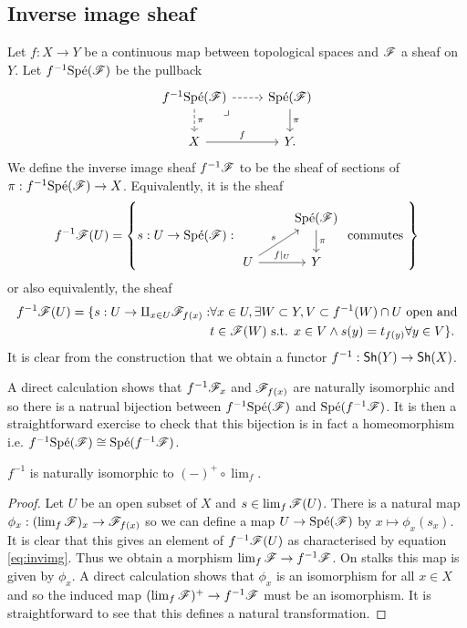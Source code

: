\documentclass{memoir}
\begin{document}
\subsection{Inverse image sheaf}
Let $f:X\to Y$ be a continuous map between topological spaces and $\mathscr{F}$ a sheaf on $Y$.
Let $f^{-1}\text{Sp\'e}(\mathscr{F})$ be the pullback 
\begin{equation}
    \begin{tikzcd}
        f^{-1}\Spe(\shf{F}) \arrow[r,dashed] \arrow[d,dashed,"\pi"] \arrow[dr, phantom, "\lrcorner", very near start] & \Spe(\shf{F}) \arrow[d,"\pi"] \\
        X \arrow[r,"f"] & Y.
    \end{tikzcd}
\end{equation}
We define the inverse image sheaf $f^{-1}\mathscr{F}$ to be the sheaf of sections of $\pi:f^{-1}\text{Sp\'e}(\mathscr{F})\to X$.
Equivalently, it is the sheaf
\begin{equation}
    \label{eq:invimg}
    f^{-1}\shf{F}(U) = \left\{s:U\to\Spe(\shf{F}): 
    \begin{tikzcd}
        & \Spe(\shf{F}) \arrow[d,"\pi"] \\
        U \arrow[r,"f|_U"] \arrow[ur,"s"] & Y
    \end{tikzcd} 
    \text{ commutes }
    \right\}
\end{equation}
or also equivalently, the sheaf
\begin{align}
    f^{-1}\mathscr{F}(U) = \{s:U\to\amalg_{x\in U}\mathscr{F}_{f(x)} : & \forall x\in U, \exists W\subset Y, V\subset f^{-1}(W)\cap U \text{ open and} \nonumber \\
                                                             & t\in\mathscr{F}(W) \text{ s.t. } x\in V \wedge  s(y) = t_{f(y)} \forall y\in V\}.
\end{align}
It is clear from the construction that we obtain a functor $f^{-1}:{\normalfont\mathsf{Sh}}(Y)\to{\normalfont\mathsf{Sh}}(X)$.
\begin{remark}
    A direct calculation shows that $f^{-1}\mathscr{F}_x$ and $\mathscr{F}_{f(x)}$ are naturally isomorphic and so there is a natrual bijection between $f^{-1}\text{Sp\'e}(\mathscr{F})$ and $\text{Sp\'e}(f^{-1}\mathscr{F})$.
    It is then a straightforward exercise to check that this bijection is in fact a homeomorphism i.e. $f^{-1}\text{Sp\'e}(\mathscr{F})\cong\text{Sp\'e}(f^{-1}\mathscr{F})$.
\end{remark}
\begin{thm}
    $f^{-1}$ is naturally isomorphic to $(-)^+\circ \lim_f$.
\end{thm}
\begin{proof}
    Let $U$ be an open subset of $X$ and $s\in\lim_f\mathscr{F}(U)$.
    There is a natural map $\phi_x:(\lim_f\mathscr{F})_x\to\mathscr{F}_{f(x)}$ so we can define a map $U\to\text{Sp\'e}(\mathscr{F})$ by $x\mapsto \phi_x(s_x)$.
    It is clear that this gives an element of $f^{-1}\mathscr{F}(U)$ as characterised by equation \ref{eq:invimg}.
    Thus we obtain a morphism $\lim_f\mathscr{F}\to f^{-1}\mathscr{F}$.
    On stalks this map is given by $\phi_x$.
    A direct calculation shows that $\phi_x$ is an isomorphism for all $x\in X$ and so the induced map $(\lim_f\mathscr{F})^+\to f^{-1}\mathscr{F}$ must be an isomorphism.
    It is straightforward to see that this defines a natural transformation.
\end{proof}
\end{document}
